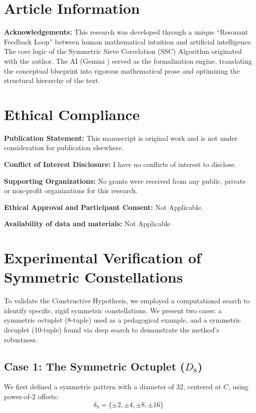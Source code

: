 \documentclass[sn-mathphys-num, pdflatex]{sn-jnl}
\begin{document}
\section*{Article Information}
\textbf{Acknowledgements:} This research was developed through a unique ``Resonant Feedback Loop'' between human mathematical intuition and artificial intelligence. The core logic of the 
Symmetric Sieve Correlation (SSC) Algorithm originated with the author. The AI (Gemini \cite{gemini2025}) served as the formalization engine, translating the conceptual blueprint into rigorous mathematical prose and optimizing the structural hierarchy of the text. 

\section*{Ethical Compliance}
\noindent \textbf{Publication Statement:} This manuscript is original work and is not under consideration for publication elsewhere. 

\noindent \textbf{Conflict of Interest Disclosure:} I have no conflicts of interest to disclose.   

\noindent \textbf{Supporting Organizations:} No grants were received from any public, private or non-profit organizations for this research. 

\noindent \textbf{Ethical Approval and Participant Consent:} Not Applicable. 

\noindent \textbf{Availability of data and materials:} Not Applicable

\appendix
\section{Experimental Verification of Symmetric Constellations}

To validate the Constructive Hypothesis, we employed a computational search to identify specific, rigid symmetric constellations. We present two cases: a symmetric octuplet (8-tuple) used as a pedagogical example, and a symmetric decuplet (10-tuple) found via deep search to demonstrate the method's robustness.

\subsection{Case 1: The Symmetric Octuplet \texorpdfstring{($D_{8}$)}{(D8)}}
We first defined a symmetric pattern with a diameter of 32, centered at $C$, using power-of-2 offsets:
\begin{equation}
    \delta_8 = \{\pm 2, \pm 4, \pm 8, \pm 16\}
\end{equation}
\end{document}
